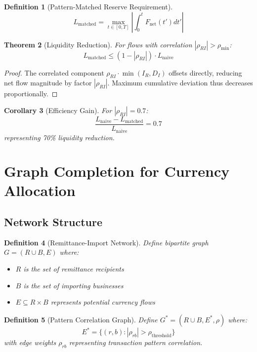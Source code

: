 \documentclass[12pt]{article}
\newtheorem{theorem}{Theorem}
\newtheorem{definition}[theorem]{Definition}
\newtheorem{corollary}[theorem]{Corollary}
\begin{document}
\begin{definition}[Pattern-Matched Reserve Requirement]
$$
L_{\text{matched}} = \max_{t \in [0,T]} \left|\int_0^t F_{\text{net}}(t') dt'\right|
$$
\end{definition}

\begin{theorem}[Liquidity Reduction]
For flows with correlation $|\rho_{RI}| > \rho_{\min}$:
$$
L_{\text{matched}} \leq (1 - |\rho_{RI}|) \cdot L_{\text{naive}}
$$
\end{theorem}

\begin{proof}
The correlated component $\rho_{RI} \cdot \min(I_R, D_I)$ offsets directly, reducing net flow magnitude by factor $|\rho_{RI}|$. Maximum cumulative deviation thus decreases proportionally.
\end{proof}

\begin{corollary}[Efficiency Gain]
For $|\rho_{RI}| = 0.7$:
$$
\frac{L_{\text{naive}} - L_{\text{matched}}}{L_{\text{naive}}} = 0.7
$$
representing 70\% liquidity reduction.
\end{corollary}

\section{Graph Completion for Currency Allocation}

\subsection{Network Structure}

\begin{definition}[Remittance-Import Network]
Define bipartite graph $G = (R \cup B, E)$ where:
\begin{itemize}
    \item $R$ is the set of remittance recipients
    \item $B$ is the set of importing businesses
    \item $E \subseteq R \times B$ represents potential currency flows
\end{itemize}
\end{definition}

\begin{definition}[Pattern Correlation Graph]
Define $G^* = (R \cup B, E^*, \rho)$ where:
$$
E^* = \{(r,b): |\rho_{rb}| > \rho_{\text{threshold}}\}
$$
with edge weights $\rho_{rb}$ representing transaction pattern correlation.
\end{definition}
\end{document}

